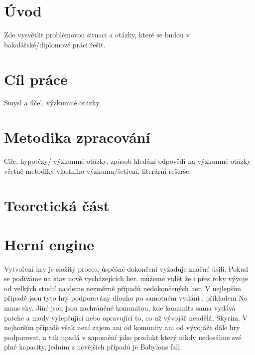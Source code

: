 \section{Úvod}


Zde vysvětlit problémovou situaci a otázky, které se budou v bakalářské/diplomové práci řešit.

\section{Cíl práce}


Smysl a účel, výzkumné otázky.

\section{Metodika zpracování}


Cíle, hypotézy/ výzkumné otázky, způsob hledání odpovědí na výzkumné otázky včetně metodiky vlastního výzkumu/šetření, literární rešerše.


\section{Teoretická část}


\section{Herní engine}
\paragraph{}
	Vytvoření hry je  složitý proces, úspěšné dokončení vyžaduje značné úsilí.
	Pokud se podíváme na stav nově vycházejících her, můžeme vidět že i přes roky vývoje od velkých studií najdeme nezměrně případů nedokončených her.
	V nejlepším případě jsou tyto hry podporovány dlouho po samotném vydání , příkladem No mans sky\cite{no_mans_sky}. 
	Jiné jsou jsou zachráněné komunitou, kde komunita sama vydává patche a mody vylepšující nebo opravující to, co už vývojář neudělá, Skyrim\cite{skyrim}.
	V nejhorším případě však není zajem ani od komunity ani od vývojáže dále hry podporovat, a tak upadá v zapomění jako produkt který nikdy nedosáhne své plné kapacity, jedním z novějších případů je Babylons fall\cite{babylons_fall}.

